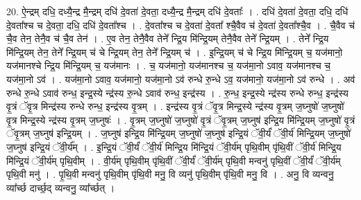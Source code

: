 \documentclass[17pt]{extarticle}
\begin{document}
20. ऐ॒न्द्रम् दधि॒ दध्यै॒न्द्र मै॒न्द्रम् दधि॑ दे॒वता॑ दे॒वता॒ दध्यै॒न्द्र मै॒न्द्रम् दधि॑ दे॒वताः᳚ । . दधि॑ दे॒वता॑ दे॒वता॒ दधि॒ दधि॑ दे॒वता᳚श्च च दे॒वता॒ दधि॒ दधि॑ दे॒वता᳚श्च । . दे॒वता᳚श्च च दे॒वता॑ दे॒वता᳚ श्चै॒वैव च॑ दे॒वता॑ दे॒वता᳚श्चै॒व । . चै॒वैव च॑ चै॒व तेन॒ तेनै॒व च॑ चै॒व तेन॑ । . ए॒व तेन॒ तेनै॒वैव तेने᳚ न्द्रि॒य मि॑न्द्रि॒यम् तेनै॒वैव तेने᳚ न्द्रि॒यम् । . तेने᳚ न्द्रि॒य मि॑न्द्रि॒यम् तेन॒ तेने᳚ न्द्रि॒यम् च॑ चे न्द्रि॒यम् तेन॒ तेने᳚ न्द्रि॒यम् च॑ । . इ॒न्द्रि॒यम् च॑ चे न्द्रि॒य मि॑न्द्रि॒यम् च॒ यज॑मानो॒ यज॑मानश्चे न्द्रि॒य मि॑न्द्रि॒यम् च॒ यज॑मानः । . च॒ यज॑मानो॒ यज॑मानश्च च॒ यज॑मा॒नो ऽवाव॒ यज॑मानश्च च॒ यज॑मा॒नो ऽव॑ । . यज॑मा॒नो ऽवाव॒ यज॑मानो॒ यज॑मा॒नो ऽव॑ रुन्धे रु॒न्धे ऽव॒ यज॑मानो॒ यज॑मा॒नो ऽव॑ रुन्धे । . अव॑ रुन्धे रु॒न्धे ऽवाव॑ रुन्ध॒ इन्द्र॒स्ये न्द्र॑स्य रु॒न्धे ऽवाव॑ रुन्ध॒ इन्द्र॑स्य । . रु॒न्ध॒ इन्द्र॒स्ये न्द्र॑स्य रुन्धे रुन्ध॒ इन्द्र॑स्य वृ॒त्रं ॅवृ॒त्र मिन्द्र॑स्य रुन्धे रुन्ध॒ इन्द्र॑स्य वृ॒त्रम् । . इन्द्र॑स्य वृ॒त्रं ॅवृ॒त्र मिन्द्र॒स्ये न्द्र॑स्य वृ॒त्रम् ज॒घ्नुषो॑ ज॒घ्नुषो॑ वृ॒त्र मिन्द्र॒स्ये न्द्र॑स्य वृ॒त्रम् ज॒घ्नुषः॑ । . वृ॒त्रम् ज॒घ्नुषो॑ ज॒घ्नुषो॑ वृ॒त्रं ॅवृ॒त्रम् ज॒घ्नुष॑ इन्द्रि॒य मि॑न्द्रि॒यम् ज॒घ्नुषो॑ वृ॒त्रं ॅवृ॒त्रम् ज॒घ्नुष॑ इन्द्रि॒यम् । . ज॒घ्नुष॑ इन्द्रि॒य मि॑न्द्रि॒यम् ज॒घ्नुषो॑ ज॒घ्नुष॑ इन्द्रि॒यं ॅवी॒र्यं॑ ॅवी॒र्य॑ मिन्द्रि॒यम् ज॒घ्नुषो॑ ज॒घ्नुष॑ इन्द्रि॒यं ॅवी॒र्य᳚म् । . इ॒न्द्रि॒यं ॅवी॒र्यं॑ ॅवी॒र्य॑ मिन्द्रि॒य मि॑न्द्रि॒यं ॅवी॒र्य॑म् पृथि॒वीम् पृ॑थि॒वीं ॅवी॒र्य॑ मिन्द्रि॒य मि॑न्द्रि॒यं ॅवी॒र्य॑म् पृथि॒वीम् । . वी॒र्य॑म् पृथि॒वीम् पृ॑थि॒वीं ॅवी॒र्यं॑ ॅवी॒र्य॑म् पृथि॒वी मन्वनु॑ पृथि॒वीं ॅवी॒र्यं॑ ॅवी॒र्य॑म् पृथि॒वी मनु॑ । . पृ॒थि॒वी मन्वनु॑ पृथि॒वीम् पृ॑थि॒वी मनु॒ वि व्यनु॑ पृथि॒वीम् पृ॑थि॒वी मनु॒ वि । . अनु॒ वि व्यन्वनु॒ व्या᳚र्च्छ दार्च्छ॒द् व्यन्वनु॒ व्या᳚र्च्छत् । \newline
\end{document}
